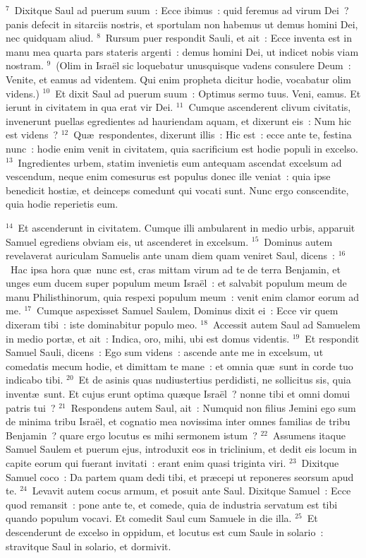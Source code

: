 ${}^{7}$~Dixitque Saul ad puerum suum~: Ecce ibimus~: quid feremus ad virum Dei~? panis defecit in sitarciis nostris, et sportulam non habemus ut demus homini Dei, nec quidquam aliud.
${}^{8}$~Rursum puer respondit Sauli, et ait~: Ecce inventa est in manu mea quarta pars stateris argenti~: demus homini Dei, ut indicet nobis viam nostram.
${}^{9}$~(Olim in Isra\"el sic loquebatur unusquisque vadens consulere Deum~: Venite, et eamus ad videntem. Qui enim propheta dicitur hodie, vocabatur olim videns.)
${}^{10}$~Et dixit Saul ad puerum suum~: Optimus sermo tuus. Veni, eamus. Et ierunt in civitatem in qua erat vir Dei.
${}^{11}$~Cumque ascenderent clivum civitatis, invenerunt puellas egredientes ad hauriendam aquam, et dixerunt eis~: Num hic est videns~?
${}^{12}$~Qu\ae\ respondentes, dixerunt illis~: Hic est~: ecce ante te, festina nunc~: hodie enim venit in civitatem, quia sacrificium est hodie populi in excelso.
${}^{13}$~Ingredientes urbem, statim invenietis eum antequam ascendat excelsum ad vescendum, neque enim comesurus est populus donec ille veniat~: quia ipse benedicit hosti\ae , et deinceps comedunt qui vocati sunt. Nunc ergo conscendite, quia hodie reperietis eum.


${}^{14}$~Et ascenderunt in civitatem. Cumque illi ambularent in medio urbis, apparuit Samuel egrediens obviam eis, ut ascenderet in excelsum.
${}^{15}$~Dominus autem revelaverat auriculam Samuelis ante unam diem quam veniret Saul, dicens~:
${}^{16}$~Hac ipsa hora qu\ae\ nunc est, cras mittam virum ad te de terra Benjamin, et unges eum ducem super populum meum Isra\"el~: et salvabit populum meum de manu Philisthinorum, quia respexi populum meum~: venit enim clamor eorum ad me.
${}^{17}$~Cumque aspexisset Samuel Saulem, Dominus dixit ei~: Ecce vir quem dixeram tibi~: iste dominabitur populo meo.
${}^{18}$~Accessit autem Saul ad Samuelem in medio port\ae , et ait~: Indica, oro, mihi, ubi est domus videntis.
${}^{19}$~Et respondit Samuel Sauli, dicens~: Ego sum videns~: ascende ante me in excelsum, ut comedatis mecum hodie, et dimittam te mane~: et omnia qu\ae\ sunt in corde tuo indicabo tibi.
${}^{20}$~Et de asinis quas nudiustertius perdidisti, ne sollicitus sis, quia invent\ae\ sunt. Et cujus erunt optima qu\ae que Isra\"el~? nonne tibi et omni domui patris tui~?
${}^{21}$~Respondens autem Saul, ait~: Numquid non filius Jemini ego sum de minima tribu Isra\"el, et cognatio mea novissima inter omnes familias de tribu Benjamin~? quare ergo locutus es mihi sermonem istum~?
${}^{22}$~Assumens itaque Samuel Saulem et puerum ejus, introduxit eos in triclinium, et dedit eis locum in capite eorum qui fuerant invitati~: erant enim quasi triginta viri.
${}^{23}$~Dixitque Samuel coco~: Da partem quam dedi tibi, et pr\ae cepi ut reponeres seorsum apud te.
${}^{24}$~Levavit autem cocus armum, et posuit ante Saul. Dixitque Samuel~: Ecce quod remansit~: pone ante te, et comede, quia de industria servatum est tibi quando populum vocavi. Et comedit Saul cum Samuele in die illa.
${}^{25}$~Et descenderunt de excelso in oppidum, et locutus est cum Saule in solario~: stravitque Saul in solario, et dormivit.


